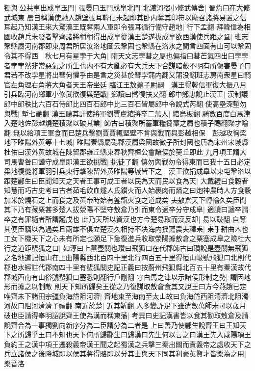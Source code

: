 獨與公共車出成臯玉門|{
	張晏曰玉門成臯北門}
北渡河宿小修武傳舍|{
	晉灼曰在大修武城東}
晨自稱漢使馳入趙壁張耳韓信未起即其卧内奪其印符以麾召諸將易置之信耳起乃知漢王來大驚漢王既奪兩人軍即令張耳循行備守趙地|{
	行下孟翻}
拜韓信為相國收趙兵未發者擊齊諸將稍稍得出成臯從漢王楚遂拔成臯欲西漢使兵距之鞏|{
	班志鞏縣屬河南郡即東周君所居汝洛地圖云鞏固也鞏縣在洛水之間言四面有山可以鞏固}
令其不得西　秋七月有星孛于大角|{
	隋天文志孛彗之屬也偏指曰彗芒氣四出曰孛孛者孛孛然非常惡氣之所生也内不有大亂必有大兵天下合謀暗蔽不明有所傷害晏子曰君若不改孛星將出彗何懼乎由是言之災甚於彗孛蒲内翻又蒲没翻班志房南衆星曰騎官左角理右角將大角者天王帝坐廷}
臨江王敖薨子尉嗣　漢王得韓信軍復大振八月引兵臨河南鄉軍小修武欲復與楚戰|{
	鄉讀曰嚮復扶又翻}
郎中鄭忠說止漢王|{
	漢制議郎中郎秩比六百石侍郎比四百石郎中比三百石皆屬郎中令說式芮翻}
使高壘深塹勿與戰|{
	塹七艶翻}
漢王聽其計使將軍劉賈盧綰將卒二萬人|{
	綰烏板翻}
騎數百度白馬津入楚地佐彭越燒楚積聚以破其業|{
	師古曰積聚所蓄軍糧芻藁之屬也積子賜翻聚才喻翻}
無以給項王軍食而已楚兵擊劉賈賈輒堅壁不肯與戰而與彭越相保　彭越攻徇梁地下睢陽外黄等十七城|{
	睢陽秦縣屬碭郡漢屬梁國故微子所封國也唐為宋州宋城縣杜佑曰漢外黄故城在陳留郡雍丘縣東春秋齊桓公會諸侯於葵丘即此}
九月項王謂大司馬曹咎曰謹守成臯即漢王欲挑戰|{
	挑徒了翻}
慎勿與戰勿令得東而已我十五日必定梁地復從將軍羽引兵東行擊陳留外黄睢陽等城皆下之　漢王欲捐成臯以東屯鞏洛以距楚酈生曰臣聞知天之天者王事可成王者以民為天而民以食為天|{
	大戴禮曰食穀者知慧而巧古史考曰古者茹毛飲血燧人氏鑚火而人始裹肉而燔之曰炮神農時人方食穀加米於燒石之上而食之及黄帝時始有釜甑火食之道成矣}
夫敖倉天下轉輸久矣臣聞其下乃有藏粟甚多楚人拔滎陽不堅守敖倉乃引而東令適卒分守成臯|{
	適讀曰讁卒謂卒之有罪讁者所謂讁戊也}
此乃天所以資漢也方今楚易取而漢反却|{
	易以䜴翻}
自奪其便臣竊以為過矣且兩雄不俱立楚漢久相持不决海内揺蕩農夫釋耒|{
	耒手耕曲木也}
工女下機天下之心未有所定也願足下急復進兵收取滎陽據敖倉之粟塞成臯之險杜大行之道距蜚狐之口|{
	如淳曰上黨壺關也瓚曰飛狐口在代郡師古曰瓚說是壺關無飛狐之名地道記恒山在上曲陽縣西北百四十里北行四百五十里得恒山岋號飛狐口北則代郡也水經註代郡南四十里有蜚狐關史記正義曰按蔚州飛狐縣北百五十里有秦漢故代郡城西南有山俗號蜚狐口塞悉則翻行戶剛翻}
守白馬之津以示諸侯形制之勢|{
	謂因地形而據之以制敵}
則天下知所歸矣王從之乃復謀取敖倉食其又說王曰方今燕趙已定唯齊未下諸田宗彊負海岱阻河濟|{
	齊地東至海南至太山故曰負海岱西阻清濟北阻濁河故曰阻河濟濟子禮翻}
南近於楚|{
	近其靳翻}
人多變詐足下雖遣數萬師未可以歲月破也臣請得奉明詔說齊王使為漢而稱東藩|{
	考異曰史記漢書皆以食其勸取敖倉及請說齊合為一事獨劉向新序分為二臣謂分為二者是}
上曰善乃使酈生說齊王曰王知天下之所歸乎王曰不知也天下何所歸酈生曰歸漢曰先生何以言之曰漢王先入咸陽項王負約王之漢中項王遷殺義帝漢王聞之起蜀漢之兵擊三秦出關而責義帝之處收天下之兵立諸侯之後降城即以侯其將得賂即以分其士與天下同其利豪英賢才皆樂為之用|{
	樂音洛}
